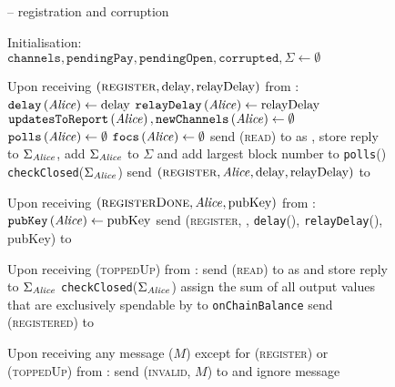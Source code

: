 \begin{figure}[H]
  \begin{systembox}{\fpaynet{} -- registration and corruption}
    \begin{algorithmic}[1]
      \State Initialisation:
      \Indent
        \State $\mathtt{channels}, \mathtt{pendingPay}, \mathtt{pendingOpen},
        \mathtt{corrupted}, \Sigma \gets \emptyset$
      \EndIndent
      \Statex

      \State Upon receiving $\left(\textsc{register}, \mathrm{delay},
      \mathrm{relayDelay}\right)$ from \alice:
      \Indent
        \State $\mathtt{delay}\left(\mathit{Alice}\right) \gets \mathrm{delay}$
        \State $\mathtt{relayDelay}\left(\mathit{Alice}\right) \gets
        \mathrm{relayDelay}$
        \State $\mathtt{updatesToReport}\left(\mathit{Alice}\right),
        \mathtt{newChannels}\left(\mathit{Alice}\right) \gets \emptyset$
        \State $\mathtt{polls}\left(\mathit{Alice}\right) \gets \emptyset$
        \State $\mathtt{focs}\left(\mathit{Alice}\right) \gets \emptyset$
        \State send (\textsc{read}) to \ledger{} as \alice{}, store reply to
        $\Sigma_{\mathit{Alice}}$, add $\Sigma_{\mathit{Alice}}$ to $\Sigma$ and add largest
        block number to \texttt{polls}(\alice)
        \label{alg:fpaynet:support:read}
        \State \texttt{checkClosed}($\Sigma_{\mathit{Alice}}$)
        \State send $\left(\textsc{register}, \mathit{Alice}, \mathrm{delay},
        \mathrm{relayDelay}\right)$ to \simulator
      \EndIndent
      \Statex

      \State Upon receiving $\left(\textsc{registerDone}, \mathit{Alice},
      \mathrm{pubKey}\right)$ from \simulator:
      \Indent
        \State $\mathtt{pubKey}\left(\mathit{Alice}\right) \gets \mathrm{pubKey}$
        \State send (\textsc{register}, \alice, \texttt{delay}(\alice),
        \texttt{relayDelay}(\alice), pubKey) to \alice
      \EndIndent
      \Statex

      \State Upon receiving (\textsc{toppedUp}) from \alice:
      \Indent
        \State send (\textsc{read}) to \ledger{} as \alice{} and store reply
        to $\Sigma_{\mathit{Alice}}$
        \State \texttt{checkClosed}($\Sigma_{\mathit{Alice}}$)
        \State assign the sum of all output values that are exclusively
        spendable by \alice{} to \texttt{onChainBalance}
        \State send (\textsc{registered}) to \alice
      \EndIndent
      \Statex

      \State Upon receiving any message ($M$) except for (\textsc{register})
      or (\textsc{toppedUp}) from \alice:
      \Indent
          \State send (\textsc{invalid}, $M$) to \alice{} and ignore message
        \EndIf
        \label{alg:fpaynet:support:unreg}
      \EndIndent
    \end{algorithmic}
  \end{systembox}
  \caption{}
  \label{alg:fpaynet:support}
\end{figure}

